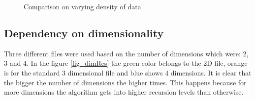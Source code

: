 \begin{figure}
\begin{minipage}{.5\linewidth}
\centering
{}
\end{minipage}%
\begin{minipage}{.5\linewidth}
\centering
{}
\end{minipage}\par\medskip

\caption{Comparison on varying density of data}
\label{fig_densRes}
\end{figure}

\subsection{Dependency on dimensionality}
Three different files were used based on the number of dimensions which were: 2, 3 and 4. In the figure \ref{fig_dimRes} the green color belongs to the 2D file, orange is for the standard 3 dimensional file and blue shows 4 dimensions. It is clear that the bigger the number of dimensions the higher times. This happens because for more dimensions the algorithm gets into higher recursion levels than otherwise.

